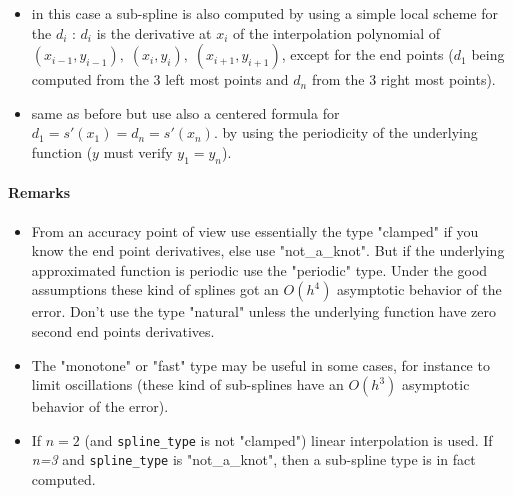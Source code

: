\begin{mandescription}
\begin{itemize}
       \item {} in this case a sub-spline is also computed by using a simple local scheme for 
              the $d_i$ :  $d_i$ is the derivative at $x_i$ of the interpolation polynomial of 
              $(x_{i-1},y_{i-1}), \; (x_i,y_i), \; (x_{i+1},y_{i+1})$, except for the end points ($d_1$ being
              computed from the 3 left most points and $d_n$ from the 3 right most points).
       \item {} same as before but use also a centered formula for $d_1 = s'(x_1) = d_n = s'(x_n)$.
              by using the periodicity of the underlying function ($y$ must verify $y_1=y_n$). 
  \end{itemize}

  \end{mandescription}


  \paragraph{Remarks}
  \begin{itemize}

       \item From an accuracy point of view use essentially the  type "clamped" if you know the
       end point derivatives, else use "not\_a\_knot". But if the underlying approximated
       function is periodic use the "periodic" type. Under the good assumptions these
       kind of splines got an $O(h^4)$ asymptotic behavior of the error. Don't use the 
        type "natural" unless the underlying function have zero second end points 
       derivatives.
       \item The "monotone" or "fast" type may be useful in some cases, for
       instance to limit oscillations (these kind of
       sub-splines have an $O(h^3)$ asymptotic behavior of the error).
       \item If $n=2$ (and \verb!spline_type! is not "clamped") linear interpolation
       is used. If {\em n=3} and \verb!spline_type! is  "not\_a\_knot", then
       a  sub-spline type is in fact computed.
    \end{itemize}



